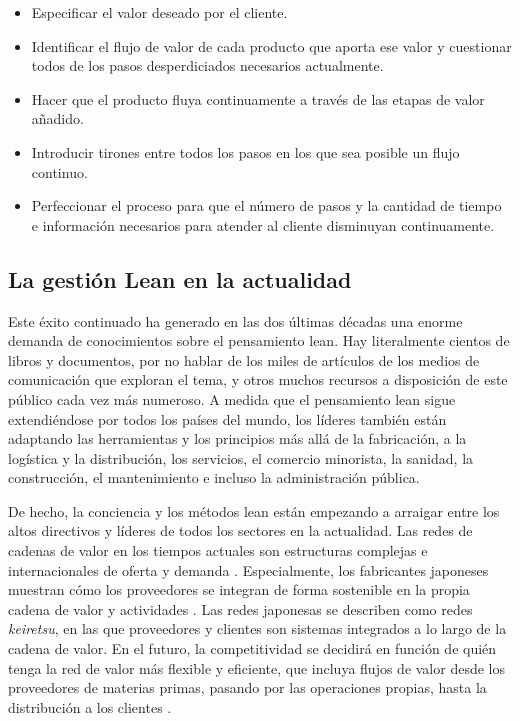 \begin{itemize}
    \item Especificar el valor deseado por el cliente.
    \item Identificar el flujo de valor de cada producto que aporta ese valor y cuestionar todos de los pasos desperdiciados necesarios actualmente.
    \item Hacer que el producto fluya continuamente a través de las etapas de valor añadido.
    \item Introducir tirones entre todos los pasos en los que sea posible un flujo continuo.
    \item Perfeccionar el proceso para que el número de pasos y la cantidad de tiempo e información necesarios para atender al cliente disminuyan continuamente.
\end{itemize}

\subsection{La gestión Lean en la actualidad}

Este éxito continuado ha generado en las dos últimas décadas una enorme demanda de conocimientos sobre el pensamiento lean.
Hay literalmente cientos de libros y documentos, por no hablar de los miles de artículos de los medios de comunicación que exploran el tema, y otros muchos recursos a disposición de este público cada vez más numeroso.
A medida que el pensamiento lean sigue extendiéndose por todos los países del mundo, los líderes también están adaptando las herramientas y los principios más allá de la fabricación, a la logística y la distribución, los servicios, el comercio minorista, la sanidad, la construcción, el mantenimiento e incluso la administración pública.

De hecho, la conciencia y los métodos lean están empezando a arraigar entre los altos directivos y líderes de todos los sectores en la actualidad.
Las redes de cadenas de valor en los tiempos actuales son estructuras complejas e internacionales de oferta y demanda \cite{helmold_global_2016}.
Especialmente, los fabricantes japoneses muestran cómo los proveedores se integran de forma sostenible en la propia cadena de valor y actividades \cite{lincoln_keiretsu_1992}.
Las redes japonesas se describen como redes \textit{keiretsu}, en las que proveedores y clientes son sistemas integrados a lo largo de la cadena de valor.
En el futuro, la competitividad se decidirá en función de quién tenga la red de valor más flexible y eficiente, que incluya flujos de valor desde los proveedores de materias primas, pasando por las operaciones propias, hasta la distribución a los clientes \cite{singh_srai_supply_2008}.

